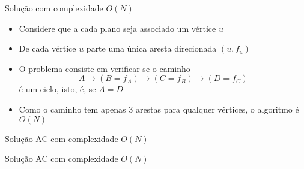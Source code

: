 \begin{frame}[fragile]{Solução com complexidade $O(N)$}

    \begin{itemize}
        \item Considere que a cada plano seja associado um vértice $u$

        \item De cada vértice $u$ parte uma única aresta direcionada $(u, f_u)$

        \item O problema consiste em verificar se o caminho 
        \[
            A\to (B = f_A)\to (C = f_B)\to (D = f_C)
        \]
        é um ciclo, isto, é, se $A = D$

        \item Como o caminho tem apenas 3 arestas para qualquer vértices, o algoritmo é
            $O(N)$
   \end{itemize}

\end{frame}

\begin{frame}[fragile]{Solução AC com complexidade $O(N)$}
\end{frame}

\begin{frame}[fragile]{Solução AC com complexidade $O(N)$}
\end{frame}
